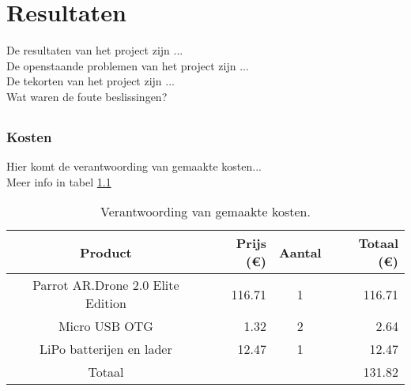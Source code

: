 \chapter{Resultaten}
De resultaten van het project zijn ...\\
De openstaande problemen van het project zijn ...\\
De tekorten van het project zijn ...\\
Wat waren de foute beslissingen?

\section{}

\subsection{Kosten}
Hier komt de verantwoording van gemaakte kosten...\\
Meer info in tabel \ref{tab:kosten}
\begin{table}[p]
\centering
\begin{tabular}{ |c|r|c|r| } \hline
Product & Prijs (\euro{}) & Aantal & Totaal (\euro{}) \\ [.5ex] \hline \hline
Parrot AR.Drone 2.0 Elite Edition & 116.71 & 1 & 116.71 \\ \hline
Micro USB OTG & 1.32 & 2 & 2.64 \\ \hline
LiPo batterijen en lader & 12.47 & 1 & 12.47 \\ \hline
Totaal & & & 131.82 \\ \hline
\end{tabular}
\caption[Kosten]{Verantwoording van gemaakte kosten.}
\label{tab:kosten}
\end{table}